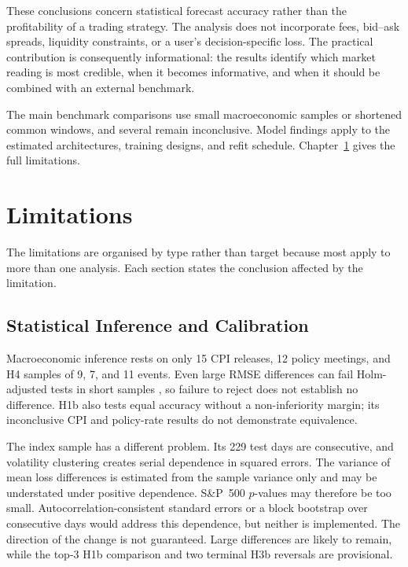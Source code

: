 \documentclass[12pt,a4paper]{report}
\begin{document}
These conclusions concern statistical forecast accuracy rather than the
profitability of a trading strategy. The analysis does not incorporate fees,
bid--ask spreads, liquidity constraints, or a user's decision-specific loss.
The practical contribution is consequently informational: the results identify
which market reading is most credible, when it becomes informative, and when it
should be combined with an external benchmark.

The main benchmark comparisons use small macroeconomic samples or shortened
common windows, and several remain inconclusive. Model findings apply to the
estimated architectures, training designs, and refit schedule.
Chapter~\ref{ch:limitations} gives the full limitations.

\chapter{Limitations}
\label{ch:limitations}

The limitations are organised by type rather than target because most apply to
more than one analysis. Each section states the conclusion affected by the
limitation.

\section{Statistical Inference and Calibration}
\label{sec:limitations-inference}

Macroeconomic inference rests on only 15 CPI releases, 12 policy meetings, and
H4 samples of 9, 7, and 11 events. Even large RMSE differences can fail
Holm-adjusted tests in short samples \parencite{harvey1997}, so failure to
reject does not establish no difference. H1b also tests equal accuracy without
a non-inferiority margin; its inconclusive CPI and policy-rate results do not
demonstrate equivalence.

The index sample has a different problem. Its 229 test days are consecutive,
and volatility clustering creates serial dependence in squared errors. The
variance of mean loss differences is estimated from the sample variance only
and may be understated under positive dependence. S\&P~500 $p$-values may
therefore be too small. Autocorrelation-consistent standard errors or a block
bootstrap over consecutive days would address this dependence, but neither is
implemented. The direction of the change is not guaranteed. Large differences
are likely to remain, while the top-3 H1b comparison and two terminal H3b
reversals are provisional.
\end{document}
